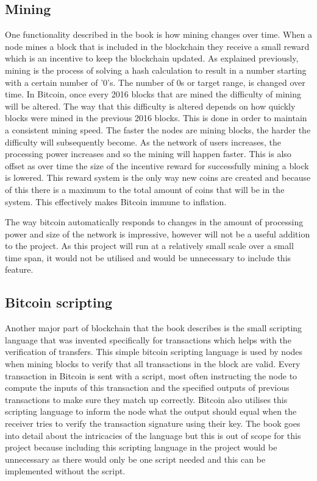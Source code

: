 \documentclass{l4proj}
\begin{document}
\subsection{Mining}
One functionality described in the book is how mining changes over time. When a node mines a block that is included in the
blockchain they receive a small reward which is an incentive to keep the blockchain updated. As explained previously,
mining is the process of solving a hash calculation to result in a number starting with a certain number of '0's. The number
of 0s or target range, is changed over time. In Bitcoin, once every 2016 blocks that are mined the difficulty of mining will be
altered. The way that this difficulty is altered depends on how quickly blocks were mined in the previous 2016 blocks. This
is done in order to maintain a consistent mining speed. The faster the nodes are mining blocks, the harder the difficulty
will subsequently become. As the network of users increases, the processing power increases and so the mining will happen
faster. This is also offset as over time the size of the incentive reward for successfully mining a block is lowered.
This reward system is the only way new coins are created and because of this there is a maximum to the total amount of coins
that will be in the system. This effectively makes Bitcoin immune to inflation.

The way bitcoin automatically responds to changes in the amount of processing power and size of the network is impressive,
however will not be a useful addition to the project. As this project will run at a relatively small scale over a small
time span, it would not be utilised and would be unnecessary to include this feature.

\subsection{Bitcoin scripting}
Another major part of blockchain that the book describes is the small scripting language that was invented specifically for
transactions which helps with the verification of transfers. This simple bitcoin scripting language is used
by nodes when mining blocks to verify that all transactions in the block are valid. Every transaction in Bitcoin is
sent with a script, most often instructing the node to compute the inputs of this transaction and the specified outputs of
previous transactions to make sure they match up correctly. Bitcoin also utilises this scripting language to inform the node
what the output should equal when the receiver tries to verify the transaction signature using their key. The book goes
into detail about the intricacies of the language but this is out of scope for this project because including this scripting language
in the project would be unnecessary as there would only be one script needed and this can be implemented without the script.
\end{document}
